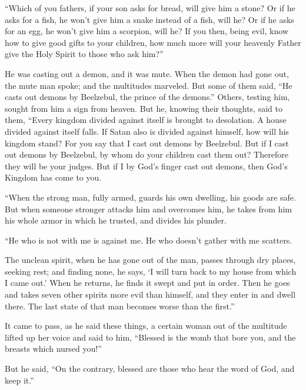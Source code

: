  ``Which of you fathers, if your son asks for bread, will
give him a stone? Or if he asks for a fish, he won't give him a snake
instead of a fish, will he?  Or if he asks for an egg, he
won't give him a scorpion, will he?  If you then, being
evil, know how to give good gifts to your children, how much more will
your heavenly Father give the Holy Spirit to those who ask him?''

 He was casting out a demon, and it was mute. When the
demon had gone out, the mute man spoke; and the multitudes marveled.
 But some of them said, ``He casts out demons by
Beelzebul, the prince of the demons.''  Others, testing
him, sought from him a sign from heaven.  But he, knowing
their thoughts, said to them, ``Every kingdom divided against itself is
brought to desolation. A house divided against itself falls.
 If Satan also is divided against himself, how will his
kingdom stand? For you say that I cast out demons by Beelzebul.
 But if I cast out demons by Beelzebul, by whom do your
children cast them out? Therefore they will be your judges.
 But if I by God's finger cast out demons, then God's
Kingdom has come to you.

 ``When the strong man, fully armed, guards his own
dwelling, his goods are safe.  But when someone stronger
attacks him and overcomes him, he takes from him his whole armor in
which he trusted, and divides his plunder.

 ``He who is not with me is against me. He who doesn't
gather with me scatters.

 The unclean spirit, when he has gone out of the man,
passes through dry places, seeking rest; and finding none, he says, `I
will turn back to my house from which I came out.'  When
he returns, he finds it swept and put in order.  Then he
goes and takes seven other spirits more evil than himself, and they
enter in and dwell there. The last state of that man becomes worse than
the first.''

 It came to pass, as he said these things, a certain
woman out of the multitude lifted up her voice and said to him,
``Blessed is the womb that bore you, and the breasts which nursed you!''

 But he said, ``On the contrary, blessed are those who
hear the word of God, and keep it.''


